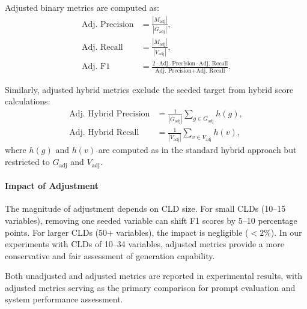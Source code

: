 Adjusted binary metrics are computed as:
\begin{align*}
\text{Adj. Precision} &= \frac{|M_{\text{adj}}|}{|G_{\text{adj}}|}, \\
\text{Adj. Recall} &= \frac{|M_{\text{adj}}|}{|V_{\text{adj}}|}, \\
\text{Adj. F1} &= \frac{2 \cdot \text{Adj. Precision} \cdot \text{Adj. Recall}}{\text{Adj. Precision} + \text{Adj. Recall}}.
\end{align*}

Similarly, adjusted hybrid metrics exclude the seeded target from hybrid score calculations:
\begin{align*}
\text{Adj. Hybrid Precision} &= \frac{1}{|G_{\text{adj}}|} \sum_{g \in G_{\text{adj}}} h(g), \\
\text{Adj. Hybrid Recall} &= \frac{1}{|V_{\text{adj}}|} \sum_{v \in V_{\text{adj}}} h(v),
\end{align*}
where \(h(g)\) and \(h(v)\) are computed as in the standard hybrid approach but restricted to \(G_{\text{adj}}\) and \(V_{\text{adj}}\).

\paragraph{Impact of Adjustment}
The magnitude of adjustment depends on CLD size. For small CLDs (10--15 variables), removing one seeded variable can shift F1 scores by 5--10 percentage points. For larger CLDs (50+ variables), the impact is negligible (\(<2\%\)). In our experiments with CLDs of 10--34 variables, adjusted metrics provide a more conservative and fair assessment of generation capability.

Both unadjusted and adjusted metrics are reported in experimental results, with adjusted metrics serving as the primary comparison for prompt evaluation and system performance assessment.



 
\label{Methods}
